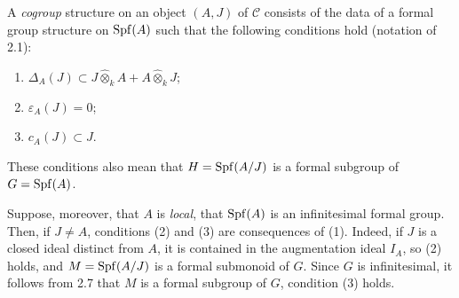 A \emph{cogroup} structure on an object $(A,J)$ of $\mathscr C$ consists of the data of a formal group structure on $\operatorname{Spf}(A)$ such that the following conditions hold (notation of 2.1):
\begin{enumerate}
\item[(1)] $\Delta_A(J)\subset J\widehat\otimes_k A+A\widehat\otimes_k J$;
\item[(2)] $\varepsilon_A(J)=0$;
\item[(3)] $c_A(J)\subset J$.
\end{enumerate}
These conditions also mean that $H=\operatorname{Spf}(A/J)$ is a formal subgroup of $G=\operatorname{Spf}(A)$.

Suppose, moreover, that $A$ is \emph{local}, \ie that $\operatorname{Spf}(A)$ is an infinitesimal formal group. Then, if $J\ne A$, conditions (2) and (3) are consequences of (1). Indeed, if $J$ is a closed ideal distinct from $A$, it is contained in the augmentation ideal $I_A$, so (2) holds, and $M=\operatorname{Spf}(A/J)$ is a formal submonoid of $G$. Since $G$ is infinitesimal, it follows from 2.7 that $M$ is a formal subgroup of $G$, \ie condition (3) holds.

